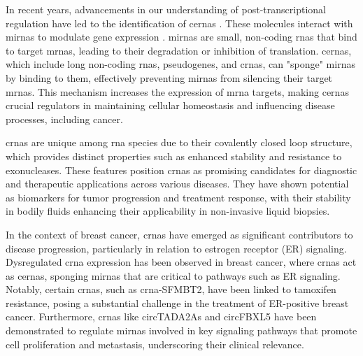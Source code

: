 In recent years, advancements in our understanding of post-transcriptional
regulation have led to the identification of \glspl{cerna}
\supercite{salmena_cerna_2011,tay_multilayered_2014}.
These molecules interact with \glspl{mirna} to modulate gene expression
\supercite{salmena_cerna_2011,li_long_2017}.
\glspl{mirna} are small, non-coding \glspl{rna} that bind to target
\glspl{mrna},
leading to their degradation or inhibition of
translation\supercite{salmena_cerna_2011,tay_multilayered_2014}.
\Glspl{cerna}, which include long non-coding \glspl{rna}, pseudogenes, and
\glspl{crna}, can
"sponge" \glspl{mirna} by binding to them, effectively preventing \glspl{mirna}
from silencing their target
\glspl{mrna}\supercite{salmena_cerna_2011,poliseno_coding-independent_2010}.
This mechanism increases the expression of \gls{mrna} targets, making
\glspl{cerna} crucial regulators in maintaining cellular homeostasis and
influencing disease processes, including
cancer\supercite{salmena_cerna_2011,vo_landscape_2019}.

\Glspl{crna} are unique among \gls{rna} species due to their covalently closed
loop
structure, which provides distinct properties such as enhanced stability and
resistance to exonucleases\supercite{vo_landscape_2019}.
These features position \glspl{crna} as promising candidates for diagnostic and
therapeutic applications across various
diseases\supercite{ma_circular_2020,hoque_exploring_2023,wilusz_circular_2017}.
They have shown potential as biomarkers for tumor progression and treatment
response\supercite{bao_prognostic_2020,ren_construction_2017}, with their
stability in bodily fluids enhancing their applicability in non-invasive liquid
biopsies\supercite{bao_prognostic_2020,zhang_circular_2018}.

In the context of breast cancer, \glspl{crna} have emerged as significant
contributors to disease progression, particularly in relation to estrogen
receptor (ER) signaling.
Dysregulated \gls{crna} expression has been observed in breast cancer, where
\glspl{crna} act as \glspl{cerna}, sponging \glspl{mirna} that are critical to
pathways such as ER signaling\supercite{nair_circular_2016,xu_circrna_2022}.
Notably, certain \glspl{crna}, such as \gls{crna}-SFMBT2, have been linked to
tamoxifen resistance, posing a substantial challenge in the treatment of
ER-positive breast cancer\supercite{li_circrna-sfmbt2_2023}.
Furthermore, \glspl{crna} like circTADA2As and circFBXL5 have been demonstrated
to regulate \glspl{mirna} involved in key signaling pathways that promote cell
proliferation and metastasis, underscoring their clinical
relevance\supercite{xu_circtada2as_2019,gao_hsa_circrna_0006528_2019}.

